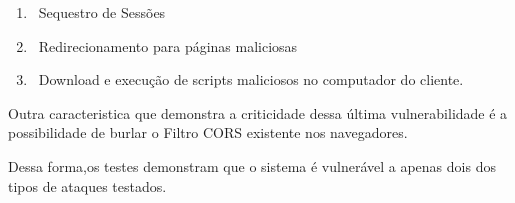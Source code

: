 \documentclass[
    12pt,               %
    openright,          %
    oneside,            %
    a4paper,            %
    section=TITLE,     %
    english,            %
    french,             %
    spanish,            %
    brazil              %
    ]{abntex2}
\begin{document}
\begin{enumerate}[start=1]
	
\item ~Sequestro de Sessões
	
\item ~Redirecionamento para páginas maliciosas
	
\item ~Download e execução de scripts maliciosos no computador do cliente.

\end{enumerate}

Outra caracteristica que demonstra a criticidade dessa última vulnerabilidade é a possibilidade de burlar o Filtro CORS existente nos navegadores.


Dessa forma,os testes demonstram que o sistema é vulnerável a apenas dois dos tipos de ataques testados.






\postextual






%
%








\printindex
\end{document}
